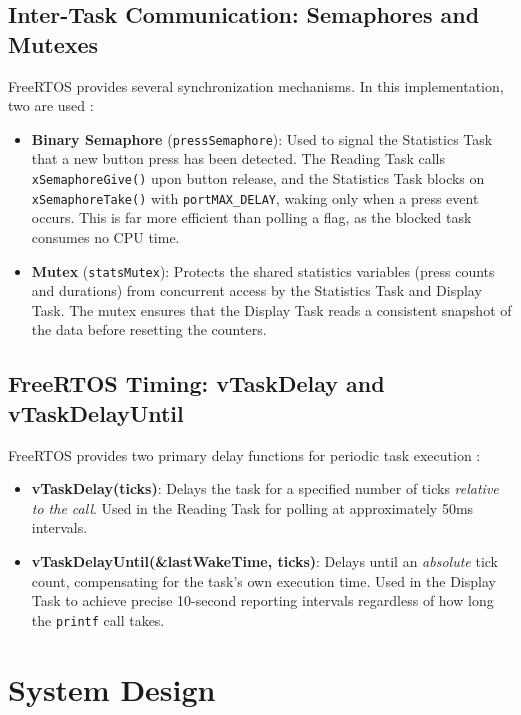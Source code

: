 \subsection{Inter-Task Communication: Semaphores and Mutexes}

FreeRTOS provides several synchronization mechanisms. In this implementation, two are used \cite{freertos_docs}:
\begin{itemize}
    \item \textbf{Binary Semaphore} (\texttt{pressSemaphore}): Used to signal the Statistics Task that a new button press has been detected. The Reading Task calls \texttt{xSemaphoreGive()} upon button release, and the Statistics Task blocks on \texttt{xSemaphoreTake()} with \texttt{portMAX\_DELAY}, waking only when a press event occurs. This is far more efficient than polling a flag, as the blocked task consumes no CPU time.
    \item \textbf{Mutex} (\texttt{statsMutex}): Protects the shared statistics variables (press counts and durations) from concurrent access by the Statistics Task and Display Task. The mutex ensures that the Display Task reads a consistent snapshot of the data before resetting the counters.
\end{itemize}

\subsection{FreeRTOS Timing: vTaskDelay and vTaskDelayUntil}

FreeRTOS provides two primary delay functions for periodic task execution \cite{freertos_docs}:
\begin{itemize}
    \item \textbf{vTaskDelay(ticks)}: Delays the task for a specified number of ticks \textit{relative to the call}. Used in the Reading Task for polling at approximately 50ms intervals.
    \item \textbf{vTaskDelayUntil(\&lastWakeTime, ticks)}: Delays until an \textit{absolute} tick count, compensating for the task's own execution time. Used in the Display Task to achieve precise 10-second reporting intervals regardless of how long the \texttt{printf} call takes.
\end{itemize}

\section{System Design}

